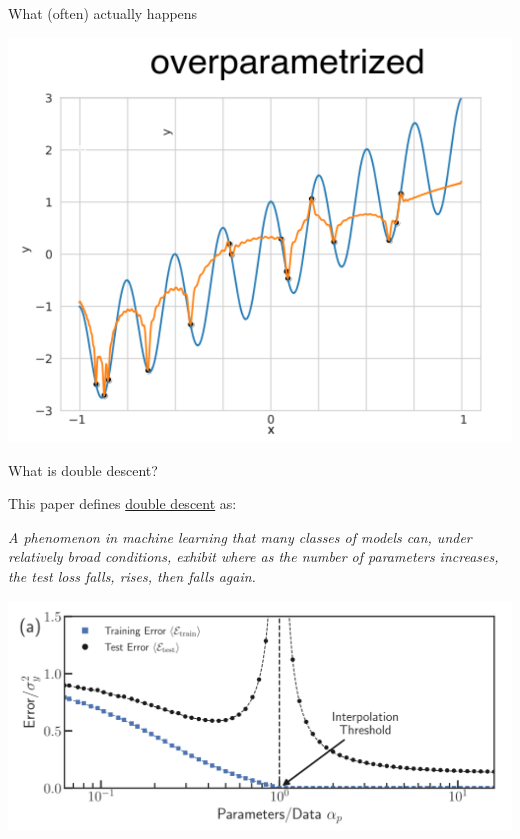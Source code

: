 \documentclass{beamer}
\begin{document}
\begin{frame}{What (often) actually happens}
\begin{center}
    \includegraphics[scale=0.28]{overparam.png}
\end{center}

\end{frame}


\begin{frame}{What is double descent?}
    
This paper defines \href{https://www.youtube.com/watch?v=Kih-VPHL3gA}{double descent} as: \\
\hspace{1.5cm}

\emph{A phenomenon in machine learning that many classes of models can, under relatively broad conditions, exhibit where as the number of parameters increases, the test loss falls, rises, then falls again.}
\pause
\begin{center}
\includegraphics[scale=0.22]{ddd.png}
\end{center}

\end{frame}
\end{document}
